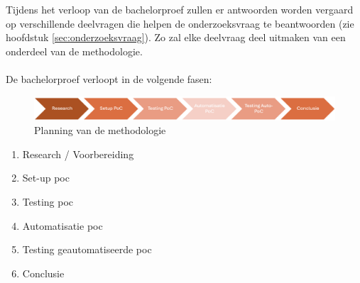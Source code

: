 
\chapter{}%
\label{ch:methodologie}

Tijdens het verloop van de bachelorproef zullen er antwoorden worden vergaard op verschillende deelvragen die helpen de onderzoeksvraag te beantwoorden (zie hoofdstuk \ref{sec:onderzoeksvraag}). Zo zal elke deelvraag deel uitmaken van een onderdeel van de methodologie.
\\\\
De bachelorproef verloopt in de volgende fasen:

\begin{figure}[h]
  \includegraphics[width=\linewidth]{../graphics/Planning.png}
  \caption{Planning van de methodologie}
  \label{fig:Planning}
\end{figure}

\begin{enumerate}
  \item Research / Voorbereiding
  \item Set-up \gls{poc}
  \item Testing \gls{poc}
  \item Automatisatie \gls{poc}
  \item Testing geautomatiseerde \gls{poc}
  \item Conclusie
\end{enumerate}

